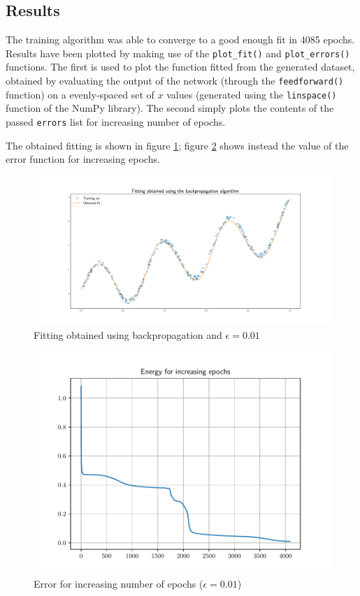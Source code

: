 \documentclass[letterpaper,headings=standardclasses]{scrartcl}
\begin{document}
\subsection{Results}

The training algorithm was able to converge to a good enough fit in 4085 epochs. Results have been plotted by making use of the \texttt{plot\_fit()} and \texttt{plot\_errors()} functions. The first is used to plot the function fitted from the generated dataset, obtained by evaluating the output of the network (through the \texttt{feedforward()} function) on a evenly-spaced set of $x$ values (generated using the \texttt{linspace()} function of the NumPy library). The second simply plots the contents of the passed \texttt{errors} list for increasing number of epochs.

The obtained fitting is shown in figure \ref{fit}; figure \ref{err} shows instead the value of the error function for increasing epochs.

\begin{figure}[h]
\centering
\includegraphics[width=\linewidth]{fit.pdf}
\caption{Fitting obtained using backpropagation and $\epsilon = 0.01$}
\label{fit}
\end{figure}

\begin{figure}[h]
\centering
\includegraphics[width=.7\linewidth]{err.pdf}
\caption{Error for increasing number of epochs ($\epsilon = 0.01$)}
\label{err}
\end{figure}
\end{document}
